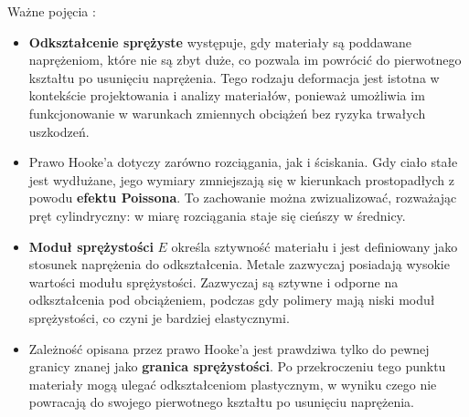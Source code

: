  Ważne pojęcia \cite{kittel1976wstep, alma991053253943408832}:
\begin{itemize}
    \item {\textbf{Odkształcenie sprężyste} występuje, gdy materiały są poddawane naprężeniom, które nie są zbyt duże, co pozwala im powrócić do pierwotnego kształtu po usunięciu naprężenia. Tego rodzaju deformacja jest istotna w kontekście projektowania i analizy materiałów, ponieważ umożliwia im funkcjonowanie w warunkach zmiennych obciążeń bez ryzyka trwałych uszkodzeń.}
    
    \item {Prawo Hooke'a dotyczy zarówno rozciągania, jak i ściskania. Gdy ciało stałe jest wydłużane, jego wymiary zmniejszają się w kierunkach prostopadłych z powodu \textbf{efektu Poissona}. To zachowanie można zwizualizować, rozważając pręt cylindryczny: w miarę rozciągania staje się cieńszy w średnicy.}

    \item {\textbf{Moduł sprężystości} $E$ określa sztywność materiału i jest definiowany jako stosunek naprężenia do odkształcenia. Metale zazwyczaj posiadają wysokie wartości modułu sprężystości. Zazwyczaj są sztywne i odporne na odkształcenia pod obciążeniem, podczas gdy polimery mają niski moduł sprężystości, co czyni je bardziej elastycznymi.}

    \item {Zależność opisana przez prawo Hooke'a jest prawdziwa tylko do pewnej granicy znanej jako \textbf{granica sprężystości}. Po przekroczeniu tego punktu materiały mogą ulegać odkształceniom plastycznym, w wyniku czego nie powracają do swojego pierwotnego kształtu po usunięciu naprężenia.}
    
\end{itemize}




\noindent\makebox[\linewidth]{\rule{\paperwidth}{0.4pt}}